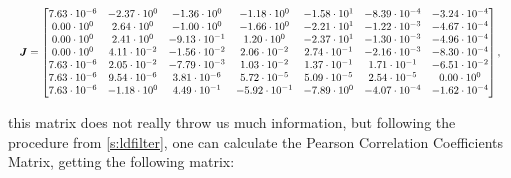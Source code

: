 \begin{equation}
    \resizebox{\textwidth}{!}{$\displaystyle
\boldsymbol{J} =\begin{bmatrix}
    7.63 \cdot 10^{-6} & -2.37 \cdot 10^{0} & -1.36 \cdot 10^{0} & -1.18 \cdot 10^{0} & -1.58 \cdot 10^{1} & -8.39 \cdot 10^{-4} & -3.24 \cdot 10^{-4} \\
    0.00 \cdot 10^{0} & 2.64 \cdot 10^{0} & -1.00 \cdot 10^{0} & -1.66 \cdot 10^{0} & -2.21 \cdot 10^{1} & -1.22 \cdot 10^{-3} & -4.67 \cdot 10^{-4} \\
    0.00 \cdot 10^{0} & 2.41 \cdot 10^{0} & -9.13 \cdot 10^{-1} & 1.20 \cdot 10^{0} & -2.37 \cdot 10^{1} & -1.30 \cdot 10^{-3} & -4.96 \cdot 10^{-4} \\
    0.00 \cdot 10^{0} & 4.11 \cdot 10^{-2} & -1.56 \cdot 10^{-2} & 2.06 \cdot 10^{-2} & 2.74 \cdot 10^{-1} & -2.16 \cdot 10^{-3} & -8.30 \cdot 10^{-4} \\
    7.63 \cdot 10^{-6} & 2.05 \cdot 10^{-2} & -7.79 \cdot 10^{-3} & 1.03 \cdot 10^{-2} & 1.37 \cdot 10^{-1} & 1.71 \cdot 10^{-1} & -6.51 \cdot 10^{-2} \\
    7.63 \cdot 10^{-6} & 9.54 \cdot 10^{-6} & 3.81 \cdot 10^{-6} & 5.72 \cdot 10^{-5} & 5.09 \cdot 10^{-5} & 2.54 \cdot 10^{-5} & 0.00 \cdot 10^{0} \\
    7.63 \cdot 10^{-6} & -1.18 \cdot 10^{0} & 4.49 \cdot 10^{-1} & -5.92 \cdot 10^{-1} & -7.89 \cdot 10^{0} & -4.07 \cdot 10^{-4} & -1.62 \cdot 10^{-4}
  \end{bmatrix},
    $}
\label{eq:jacobianFPGA}
\end{equation}

this matrix does not really throw us much information, but following the procedure from \autoref{s:ldfilter}, one can calculate the Pearson Correlation Coefficients Matrix, getting the following matrix:

